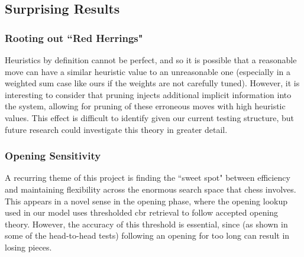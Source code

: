 \documentclass[letterpaper]{article}
\begin{document}

\subsection{Surprising Results}
\subsubsection{Rooting out ``Red Herrings"}
Heuristics by definition cannot be perfect, and so it is possible that a reasonable move can have a similar heuristic value to an unreasonable one (especially in a weighted sum case like ours if the weights are not carefully tuned).  However, it is interesting to consider that pruning injects additional implicit information into the system, allowing for pruning of these erroneous moves with high heuristic values.  This effect is difficult to identify given our current testing structure, but future research could investigate this theory in greater detail.

\subsubsection{Opening Sensitivity}
A recurring theme of this project is finding the ``sweet spot" between efficiency and maintaining flexibility across the enormous search space that chess involves.  This appears in a novel sense in the opening phase, where the opening lookup used in our model uses thresholded \acrshort{cbr} retrieval to follow accepted opening theory.  However, the accuracy of this threshold is essential, since (as shown in some of the head-to-head tests) following an opening for too long can result in losing pieces.
\end{document}
